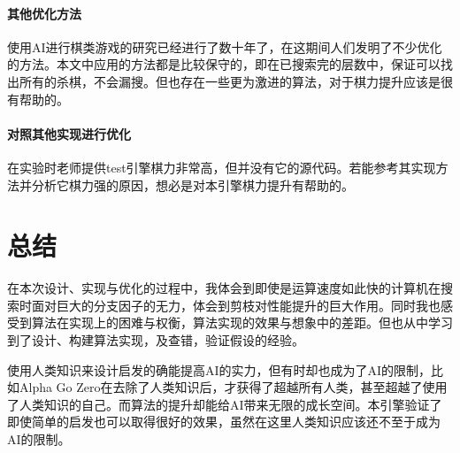 \documentclass{ctexart}
\begin{document}
\paragraph{其他优化方法} 使用AI进行棋类游戏的研究已经进行了数十年了，在这期间人们发明了不少优化的方法。本文中应用的方法都是比较保守的，即在已搜索完的层数中，保证可以找出所有的杀棋，不会漏搜。但也存在一些更为激进的算法，对于棋力提升应该是很有帮助的。

\paragraph{对照其他实现进行优化} 在实验时老师提供test引擎棋力非常高，但并没有它的源代码。若能参考其实现方法并分析它棋力强的原因，想必是对本引擎棋力提升有帮助的。

\section{总结}

在本次设计、实现与优化的过程中，我体会到即使是运算速度如此快的计算机在搜索时面对巨大的分支因子的无力，体会到剪枝对性能提升的巨大作用。同时我也感受到算法在实现上的困难与权衡，算法实现的效果与想象中的差距。但也从中学习到了设计、构建算法实现，及查错，验证假设的经验。

使用人类知识来设计启发的确能提高AI的实力，但有时却也成为了AI的限制，比如Alpha Go Zero在去除了人类知识后，才获得了超越所有人类，甚至超越了使用了人类知识的自己。而算法的提升却能给AI带来无限的成长空间。本引擎验证了即使简单的启发也可以取得很好的效果，虽然在这里人类知识应该还不至于成为AI的限制。

 

\end{document}
